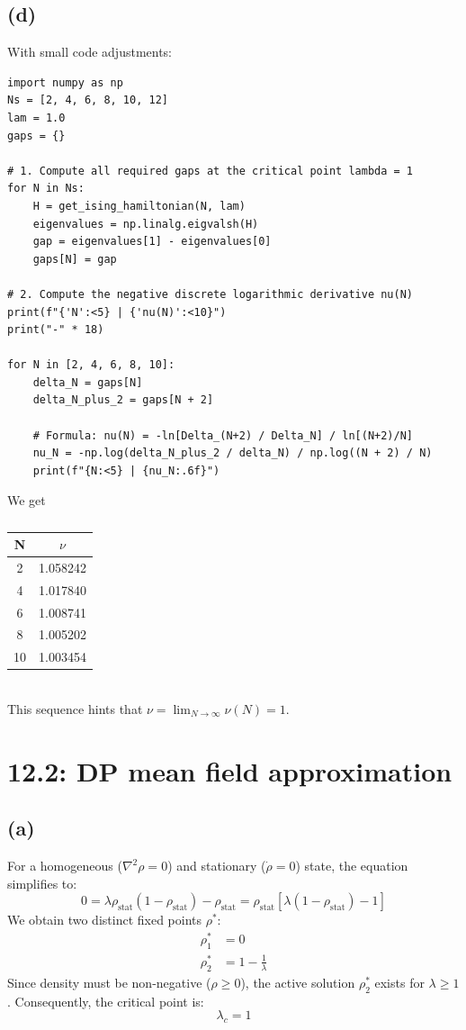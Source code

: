 \documentclass{article}
\begin{document}
\subsection*{(d)}
With small code adjustments: 
\begin{verbatim}
import numpy as np
Ns = [2, 4, 6, 8, 10, 12]
lam = 1.0
gaps = {}

# 1. Compute all required gaps at the critical point lambda = 1
for N in Ns:
    H = get_ising_hamiltonian(N, lam)
    eigenvalues = np.linalg.eigvalsh(H)
    gap = eigenvalues[1] - eigenvalues[0]
    gaps[N] = gap

# 2. Compute the negative discrete logarithmic derivative nu(N)
print(f"{'N':<5} | {'nu(N)':<10}")
print("-" * 18)

for N in [2, 4, 6, 8, 10]:
    delta_N = gaps[N]
    delta_N_plus_2 = gaps[N + 2]

    # Formula: nu(N) = -ln[Delta_(N+2) / Delta_N] / ln[(N+2)/N]
    nu_N = -np.log(delta_N_plus_2 / delta_N) / np.log((N + 2) / N)
    print(f"{N:<5} | {nu_N:.6f}")
\end{verbatim}
We get 
\begin{table}[h!]
    \centering
    \begin{tabular}{c|c}
         N& $\nu$  \\
         \hline
         2&  1.058242\\
         4&  1.017840\\
         6&  1.008741\\
         8&  1.005202\\
         10& 1.003454
    \end{tabular}
    \caption{}
    \label{tab:placeholder}
\end{table}\\

This sequence hints that $\nu=\lim_{N\to\infty}\nu(N)=1$.

\section*{12.2: DP mean field approximation}
\subsection*{(a)}
For a homogeneous ($\nabla^2\rho = 0$) and stationary ($\dot{\rho} = 0$) state, the equation simplifies to:
\begin{equation}
    0 = \lambda\rho_{\text{stat}}(1 - \rho_{\text{stat}}) - \rho_{\text{stat}} = \rho_{\text{stat}} \left[ \lambda(1 - \rho_{\text{stat}}) - 1 \right]
\end{equation}
We obtain two distinct fixed points $\rho^*$:
\begin{align}
    \rho_1^* &= 0 \\
    \rho_2^* &= 1 - \frac{1}{\lambda}
\end{align}
Since density must be non-negative ($\rho \ge 0$), the active solution $\rho_2^*$ exists for $\lambda \ge 1$. Consequently, the critical point is:
\begin{equation}
    \lambda_c = 1
\end{equation}
\end{document}
